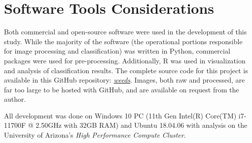 \documentclass[letterpaper]{report}
\begin{document}
\section{Software Tools Considerations}
Both commercial and open-source software were used in the development of this study. While the majority of the software (the operational portions responsible for image processing and classification) was written in Python, commercial packages were used for pre-processing. Additionally, R was used in visualization and analysis of classification results. The complete source code for this project is available in this GitHub repository: \href{https://github.com/evan-mcginnis/weeds}{\textit {weeds}}. Images, both raw and processed, are far too large to be hosted with GitHub, and are available on request from the author.

All development was done on Windows 10 PC (11th Gen Intel(R) Core(TM) i7-11700F @ 2.50GHz with 32GB RAM) and Ubuntu 18.04.06 with analysis on the University of Arizona's \textit{High Performance Compute Cluster}.
\end{document}
